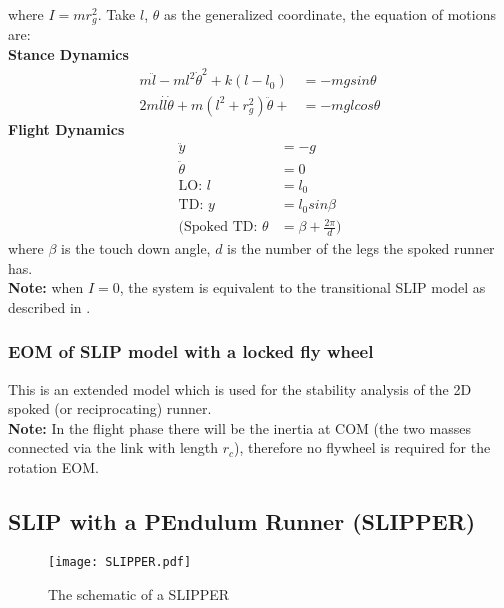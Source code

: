 \noindent
where $I = mr_g^2$. Take $l$, $\theta$ as the generalized coordinate, the equation of motions are:\\
\noindent
\textbf {Stance Dynamics}
\begin{align*}
m\ddot{l} - ml^2\dot{\theta}^2 + k(l-l_0) &= -mgsin\theta\\
2ml\dot l \dot{\theta} + m(l^2+r_g^2)\ddot{\theta} +   &= -mglcos\theta
\end{align*}
\noindent
\textbf {Flight Dynamics}
\begin{align*}
\ddot y &= -g\\
\ddot \theta &= 0\\
\text{LO: } l &= l_0\\
\text{TD: } y &= l_0sin\beta\\
\text{(Spoked TD: } \theta &= \beta + \frac{2\pi}{d}\text{)}
\end{align*}
where $\beta$ is the touch down angle, $d$ is the number of the legs the spoked runner has.\\
\textbf{Note:} when $I = 0$, the system is equivalent to the transitional SLIP model as described in  \cite{Shen2016}.



\subsubsection{EOM of SLIP model with a locked fly wheel}
This is an extended model which is used for the stability analysis of the 2D spoked (or reciprocating) runner.\\
\textbf{Note:} In the flight phase there will be the inertia at COM (the two masses connected via the link with length $r_c$), therefore no flywheel is required for the rotation EOM.


\subsection{SLIP with a PEndulum Runner (SLIPPER)}
\begin{figure}[h]
\centering

\texttt{[image: SLIPPER.pdf]}
\caption{The schematic of a SLIPPER}
\label{fig.SLIPPER}
\end{figure}


